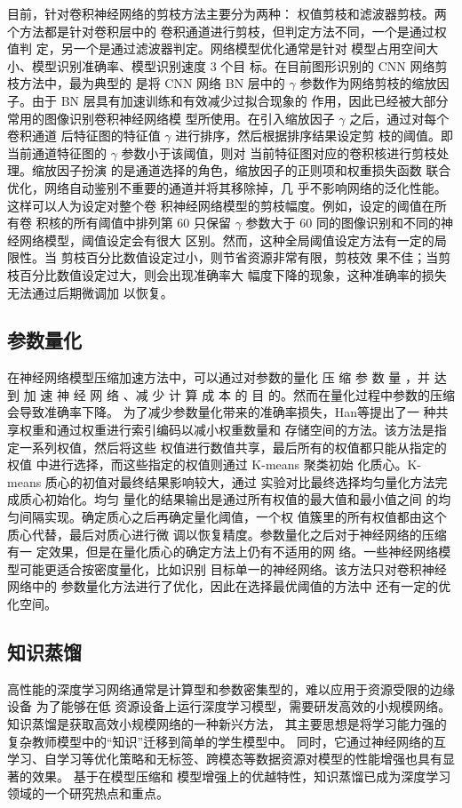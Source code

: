 目前，针对卷积神经网络的剪枝方法主要分为两种：
权值剪枝和滤波器剪枝。两个方法都是针对卷积层中的
卷积通道进行剪枝，但判定方法不同，一个是通过权值判
定，另一个是通过滤波器判定。网络模型优化通常是针对
模型占用空间大小、模型识别准确率、模型识别速度 3 个目
标。在目前图形识别的 CNN 网络剪枝方法中，最为典型的
是将 CNN 网络 BN 层中的 $\gamma$ 参数作为网络剪枝的缩放因
子\cite{liu2017learning}。由于 BN 层具有加速训练和有效减少过拟合现象的
作用，因此已经被大部分常用的图像识别卷积神经网络模
型所使用。在引入缩放因子 $\gamma$ 之后，通过对每个卷积通道
后特征图的特征值 $\gamma$ 进行排序，然后根据排序结果设定剪
枝的阈值。即当前通道特征图的 $\gamma$ 参数小于该阈值，则对
当前特征图对应的卷积核进行剪枝处理。缩放因子扮演
的是通道选择的角色，缩放因子的正则项和权重损失函数
联合优化，网络自动鉴别不重要的通道并将其移除掉，几
乎不影响网络的泛化性能。这样可以人为设定对整个卷
积神经网络模型的剪枝幅度。例如，设定的阈值在所有卷
积核的所有阈值中排列第 60%
只保留 $\gamma$ 参数大于 60%
同的图像识别和不同的神经网络模型，阈值设定会有很大
区别。然而，这种全局阈值设定方法有一定的局限性。当
剪枝百分比数值设定过小，则节省资源非常有限，剪枝效
果不佳；当剪枝百分比数值设定过大，则会出现准确率大
幅度下降的现象，这种准确率的损失无法通过后期微调加
以恢复。

\subsection{参数量化}
在神经网络模型压缩加速方法中，可以通过对参数的量化
压 缩 参 数 量 ，并 达 到 加 速 神 经 网 络 、减 少 计 算 成 本 的 目
的\cite{li2016pruning}。然而在量化过程中参数的压缩会导致准确率下降。
为了减少参数量化带来的准确率损失，Han等提出了一
种共享权重和通过权重进行索引编码以减小权重数量和
存储空间的方法。该方法是指定一系列权值，然后将这些
权值进行数值共享，最后所有的权值都只能从指定的权值
中进行选择，而这些指定的权值则通过 K-means 聚类初始
化质心。K-means 质心的初值对最终结果影响较大，通过
实验对比最终选择均匀量化方法完成质心初始化。均匀
量化的结果输出是通过所有权值的最大值和最小值之间
的均匀间隔实现。确定质心之后再确定量化阈值，一个权
值簇里的所有权值都由这个质心代替，最后对质心进行微
调以恢复精度。参数量化之后对于神经网络的压缩有一
定效果，但是在量化质心的确定方法上仍有不适用的网
络。一些神经网络模型可能更适合按密度量化，比如识别
目标单一的神经网络。该方法只对卷积神经网络中的
参数量化方法进行了优化，因此在选择最优阈值的方法中
还有一定的优化空间。

\subsection{知识蒸馏}
高性能的深度学习网络通常是计算型和参数密集型的，难以应用于资源受限的边缘设备  为了能够在低
资源设备上运行深度学习模型，需要研发高效的小规模网络。  知识蒸馏是获取高效小规模网络的一种新兴方法，
其主要思想是将学习能力强的复杂教师模型中的“知识”迁移到简单的学生模型中。  同时，它通过神经网络的互
学习、自学习等优化策略和无标签、跨模态等数据资源对模型的性能增强也具有显著的效果。  基于在模型压缩和
模型增强上的优越特性，知识蒸馏已成为深度学习领域的一个研究热点和重点。 

